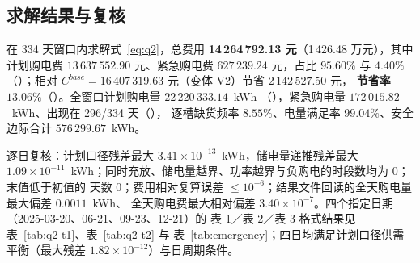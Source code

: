 \subsection{求解结果与复核}\label{sec:q2-results}

在 334 天窗口内求解式~\eqref{eq:q2}，总费用 \textbf{14\,264\,792.13 元}（1\,426.48 万元），其中
计划购电费 \(13\,637\,552.90\) 元、紧急购电费 \(627\,239.24\) 元，占比 \(95.60\%\) 与 \(4.40\%\)
（）；相对 \(C^{base}=16\,407\,319.63\) 元（变体 V2）节省 \(2\,142\,527.50\) 元，
\textbf{节省率 \(13.06\%\)}（）。全窗口计划购电量 \(22\,220\,333.14\)~kWh
（），紧急购电量 \(172\,015.82\)~kWh、出现在 296/334 天（），
逐槽缺货频率 \(8.55\%\)、电量满足率 \(99.04\%\)、安全边际合计 \(576\,299.67\)~kWh。

逐日复核：计划口径残差最大 \(3.41\times10^{-13}\)~kWh，储电量递推残差最大
\(1.09\times10^{-11}\)~kWh；同时充放、储电量越界、功率越界与负购电的时段数均为 0；末值低于初值的
天数 0；费用相对复算误差 \(\le10^{-6}\)；结果文件回读的全天购电量最大偏差 \(0.0011\)~kWh、
全天购电费最大相对偏差 \(3.40\times10^{-7}\)。四个指定日期（2025-03-20、06-21、09-23、12-21）的
表 1／表 2／表 3 格式结果见 表~\ref{tab:q2-t1}、表~\ref{tab:q2-t2} 与
表~\ref{tab:emergency}；四日均满足计划口径供需平衡（最大残差 \(1.82\times10^{-12}\)）与日周期条件。

